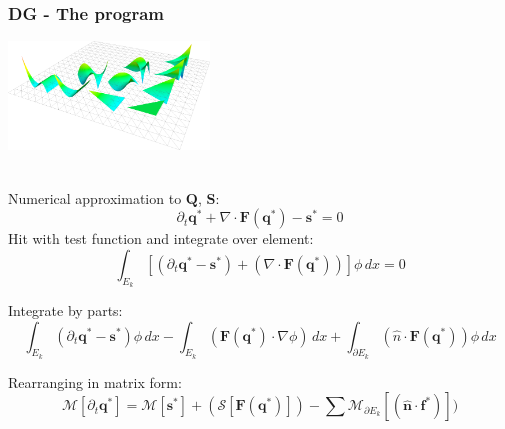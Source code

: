 \begin{frame}\frametitle{DG - The program}
  \begin{multicols}{2}
    \includegraphics[width=0.4\textwidth]{figures/pkdo-2d.png}
    \vspace{-10pt}
   
    \vspace{-10pt}
    \columnbreak \\
    Numerical approximation to $\mathbf{Q}$, $\mathbf{S}$:
    \begin{equation*}
      \partial_t\mathbf{q}^{*} + \nabla \cdot \mathbf{F}(\mathbf{q}^{*}) - \mathbf{s}^{*} = 0
    \end{equation*}
    Hit with test function and integrate over element:
    \begin{equation*}
      \int_{E_k}[(\partial_t\mathbf{q}^{*} - \mathbf{s}^{*}) + (\nabla \cdot \mathbf{F}(\mathbf{q}^{*}))]\phi\,dx = 0
    \end{equation*}
  \end{multicols}
  \begin{center}
    Integrate by parts:
    \begin{equation*}
      \int_{E_k}(\partial_t\mathbf{q}^{*}- \mathbf{s}^{*})\phi\,dx -
      \int_{E_k}(\mathbf{F}(\mathbf{q}^{*}) \cdot \nabla{\phi})\,dx +
      \int_{\partial{E_k}}(\hat{n} \cdot \mathbf{F}(\mathbf{q}^{*}))\phi\,dx
    \end{equation*}
  \end{center}
  \begin{center}
    Rearranging in matrix form:
    \begin{equation*}
      \mathcal{M}[\partial_t\mathbf{q}^{*}] = \mathcal{M}[\mathbf{s}^{*}] + ( \mathcal{S}[\mathbf{F}(\mathbf{q}^{*})] )
      - \sum{\mathcal{M}_{\partial{E_k}}[(\hat{\mathbf{n}} \cdot \mathbf{f}^{*})]} ) 
    \end{equation*}
  \end{center}
\end{frame}

